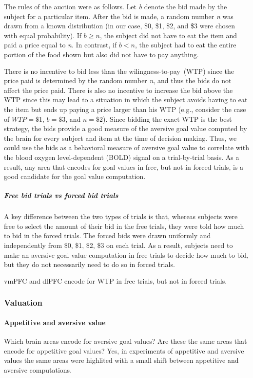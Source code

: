 \documentclass[12pt,article,oneside,a4paper]{memoir}
\begin{document}
The rules of the auction were as follows. Let \textit{b} denote the bid made by
the subject for a particular item. After the bid is made, a random number
\textit{n} was drawn from a known distribution (in our case, \$0, \$1, \$2, and
\$3 were chosen with equal probability). If $b \geq n$, the subject did not
have to eat the item and paid a price equal to \textit{n}. In contrast, if $b <
n$, the subject had to eat the entire portion of the food shown but also did
not have to pay anything.

There is no incentive to bid less than the wilingness-to-pay~(WTP) since the
price paid is determined by the random number \textit{n}, and thus the bids do
not affect the price paid.
There is also no incentive to increase the bid above the WTP since this may
lead to a situation in which the subject avoids having to eat the item but ends
up paying a price larger than his WTP (e.g., consider the case of $WTP = \$1$,
$b = \$3$, and $n = \$2$). Since bidding the exact WTP is the best strategy,
the bids provide a good measure of the aversive goal value computed by the
brain for every subject and item at the time of decision making. Thus, we could
use the bids as a behavioral measure of aversive goal value to correlate with
the blood oxygen level-dependent (BOLD) signal on a trial-by-trial basis. As a
result, any area that encodes for goal values in free, but not in forced
trials, is a good candidate for the goal value computation.

\subparagraph{Free bid trials vs forced bid trials}
A key difference between the two types of trials is that, whereas subjects were
free to select the amount of their bid in the free trials, they were told how
much to bid in the forced trials. The forced bids were drawn uniformly and
independently from \$0, \$1, \$2, \$3 on each trial. As a result, subjects need
to make an aversive goal value computation in free trials to decide how much to
bid, but they do not necessarily need to do so in forced trials.

vmPFC and dlPFC encode for WTP in free trials, but not in forced trials.

\subsubsection{Valuation}
\paragraph{Appetitive and aversive value}
Which brain areas encode for aversive goal values?
Are these the same areas that encode for appetitive goal values?
Yes, in experiments of appetitive and aversive values the same areas were
highlited with a small shift between appetitive and aversive computations.
\end{document}

